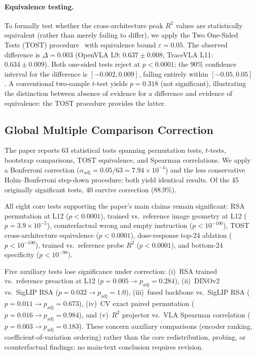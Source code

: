 \paragraph{Equivalence testing.}
To formally test whether the cross-architecture peak $R^2$ values are statistically equivalent (rather than merely failing to differ), we apply the Two One-Sided Tests (TOST) procedure~\cite{lakens2017equivalence} with equivalence bound $\varepsilon = 0.05$.
The observed difference is $\Delta = 0.003$ (OpenVLA L9: $0.637 \pm 0.008$; TraceVLA L11: $0.634 \pm 0.009$).
Both one-sided tests reject at $p < 0.0001$; the 90\% confidence interval for the difference is $[-0.002, 0.009]$, falling entirely within $[-0.05, 0.05]$.
A conventional two-sample $t$-test yields $p = 0.318$ (not significant), illustrating the distinction between absence of evidence for a difference and evidence of equivalence: the TOST procedure provides the latter.

\subsection{Global Multiple Comparison Correction}
\label{sec:bonferroni_correction}

The paper reports 63 statistical tests spanning permutation tests, $t$-tests, bootstrap comparisons, TOST equivalence, and Spearman correlations.
We apply a Bonferroni correction ($\alpha_{\text{adj}} = 0.05 / 63 = 7.94 \times 10^{-4}$) and the less conservative Holm--Bonferroni step-down procedure; both yield identical results.
Of the 45 originally significant tests, 40 survive correction (88.9\%).

All eight core tests supporting the paper's main claims remain significant:
RSA permutation at L12 ($p < 0.0001$), trained vs.\ reference image geometry at L12 ($p = 3.9 \times 10^{-5}$), counterfactual wrong and empty instruction ($p < 10^{-100}$), TOST cross-architecture equivalence ($p < 0.0001$), dose-response top-24 ablation ($p < 10^{-100}$), trained vs.\ reference probe $R^2$ ($p < 0.0001$), and bottom-24 specificity ($p < 10^{-90}$).

Five auxiliary tests lose significance under correction:
(i)~RSA trained vs.\ reference preaction at L12 ($p = 0.005 \to p_{\text{adj}} = 0.284$),
(ii)~DINOv2 vs.\ SigLIP RSA ($p = 0.032 \to p_{\text{adj}} = 1.0$),
(iii)~fused backbone vs.\ SigLIP RSA ($p = 0.011 \to p_{\text{adj}} = 0.673$),
(iv)~CV exact paired permutation ($p = 0.016 \to p_{\text{adj}} = 0.984$),
and (v)~$R^2$ projector vs.\ VLA Spearman correlation ($p = 0.003 \to p_{\text{adj}} = 0.183$).
These concern auxiliary comparisons (encoder ranking, coefficient-of-variation ordering) rather than the core redistribution, probing, or counterfactual findings; no main-text conclusion requires revision.

